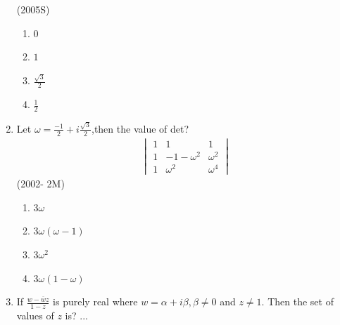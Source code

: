 \documentclass[journal,12pt,twocolumn]{IEEEtran}
\theoremstyle{remark}
\begin{document}
\begin{enumerate}
        \hfill{(2005S)}
\begin{enumerate}[label=(\alph*)]
	\item $0$
	\item $1$
	\item $\frac{\sqrt{3}}{2}$
	\item $\frac{1}{2}$
\end{enumerate}
\item Let $\omega=\frac{-1}{2}+i\frac{\sqrt{3}}{2}$,then the value of det?\\
	\begin{align}
		\begin{vmatrix}
	1&1&1\\
	1&-1-\omega^{2}&\omega^{2}\\
	1&\omega^{2}&\omega^{4}
                \end{vmatrix}
	\end{align}
	\hfill{(2002- 2M)}
\begin{enumerate}[label=(\alph*)]
	\item $3\omega$
	\item $3\omega(\omega-1)$
	\item $3\omega^{2}$
	\item $3\omega(1-\omega)$
\end{enumerate}
\item If $\frac{w-\overline{w}z}{1-z}$ is purely real where $w=\alpha+i\beta, \beta \neq 0$ and $z \neq 1$. Then the set of values of $z$ is?                     ...\\


\end{enumerate}
\end{document}
